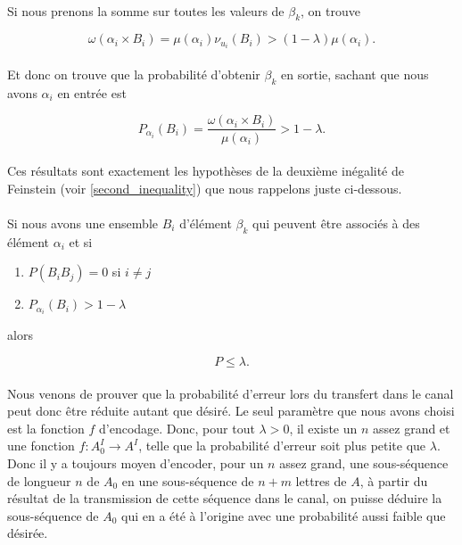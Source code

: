 	\paragraph{}Si nous prenons la somme sur toutes les valeurs de $\beta_k$, on trouve
	
	\[\omega(\alpha_i \times B_i)=\mu(\alpha_i)\nu_{u_i}(B_i)>(1-\lambda)\mu(\alpha_i).\]
	
	\paragraph{}
	Et donc on trouve que la probabilité d'obtenir $\beta_k$ en sortie, sachant que nous avons $\alpha_i$ en entrée est
	
	\[P_{\alpha_i}(B_i)=\frac{\omega(\alpha_i \times B_i)}{\mu(\alpha_i)}>1-\lambda.\]
	
	\paragraph{}
	Ces résultats sont exactement les hypothèses de la deuxième inégalité de Feinstein (voir \ref{second_inequality}) 
	que nous rappelons juste ci-dessous.
	
	\paragraph{}
	Si nous avons une ensemble $B_i$ d'élément $\beta_k$ qui peuvent être associés à des élément $\alpha_i$ et si 
	\begin{enumerate}
		\item $P(B_iB_j)=0$ si $i\neq j$
		\item $P_{\alpha_i}(B_i)>1-\lambda$
	\end{enumerate}
	alors 
	
	\[P\le \lambda.\]
	
	\paragraph{}Nous venons de prouver que la probabilité d'erreur lors du transfert dans le canal peut donc être réduite autant que désiré.
	Le seul paramètre que nous avons choisi est la fonction $f$ d'encodage. Donc, pour tout $\lambda >0$, il existe un $n$ assez grand et
	une fonction $f : A_0^I \to A^I$, telle que la probabilité d'erreur soit plus petite que $\lambda$. Donc il y a toujours moyen d'encoder,
	pour un $n$ assez grand, une sous-séquence de longueur $n$ de $A_0$ en une sous-séquence de $n+m$ lettres de $A$, à partir du résultat 
	de la transmission de cette séquence dans le canal, on puisse déduire la sous-séquence de $A_0$ qui en a été à l'origine avec une 
	probabilité aussi faible que désirée.
	

